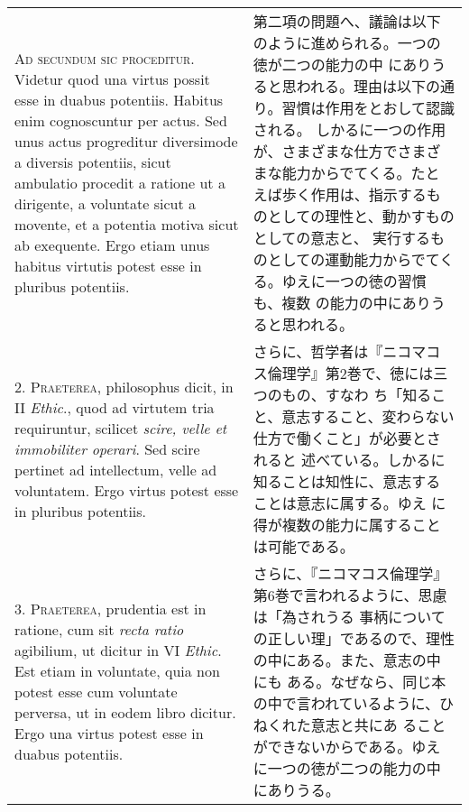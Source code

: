 \documentclass[10pt]{jsarticle}
\begin{document}
\begin{longtable}{p{21em}p{21em}}



\newpage
{\scshape Ad secundum sic proceditur}. Videtur quod una virtus possit
esse in duabus potentiis. Habitus enim cognoscuntur per actus. Sed
unus actus progreditur diversimode a diversis potentiis, sicut
ambulatio procedit a ratione ut a dirigente, a voluntate sicut a
movente, et a potentia motiva sicut ab exequente. Ergo etiam unus
habitus virtutis potest esse in pluribus potentiis.

&

第二項の問題へ、議論は以下のように進められる。一つの徳が二つの能力の中
にありうると思われる。理由は以下の通り。習慣は作用をとおして認識される。
しかるに一つの作用が、さまざまな仕方でさまざまな能力からでてくる。たと
えば歩く作用は、指示するものとしての理性と、動かすものとしての意志と、
実行するものとしての運動能力からでてくる。ゆえに一つの徳の習慣も、複数
の能力の中にありうると思われる。

\\



2. {\scshape Praeterea}, philosophus dicit, in II {\itshape Ethic}.,
quod ad virtutem tria requiruntur, scilicet {\itshape scire, velle et
immobiliter operari}. Sed scire pertinet ad intellectum, velle ad
voluntatem. Ergo virtus potest esse in pluribus potentiis.

&

さらに、哲学者は『ニコマコス倫理学』第2巻で、徳には三つのもの、すなわ
ち「知ること、意志すること、変わらない仕方で働くこと」が必要とされると
述べている。しかるに知ることは知性に、意志することは意志に属する。ゆえ
に得が複数の能力に属することは可能である。

\\


3. {\scshape Praeterea}, prudentia est in ratione, cum sit {\itshape
recta ratio} agibilium, ut dicitur in VI {\itshape Ethic}. Est etiam
in voluntate, quia non potest esse cum voluntate perversa, ut in eodem
libro dicitur. Ergo una virtus potest esse in duabus potentiis.

&

さらに、『ニコマコス倫理学』第6巻で言われるように、思慮は「為されうる
事柄についての正しい理」であるので、理性の中にある。また、意志の中にも
ある。なぜなら、同じ本の中で言われているように、ひねくれた意志と共にあ
ることができないからである。ゆえに一つの徳が二つの能力の中にありうる。


\end{longtable}
\end{document}
